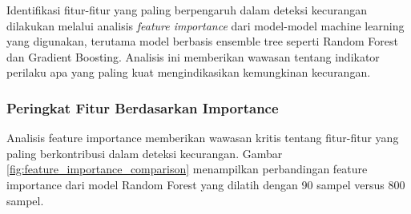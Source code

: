 Identifikasi fitur-fitur yang paling berpengaruh dalam deteksi kecurangan dilakukan melalui analisis \textit{feature importance} dari model-model machine learning yang digunakan, terutama model berbasis ensemble tree seperti Random Forest dan Gradient Boosting. Analisis ini memberikan wawasan tentang indikator perilaku apa yang paling kuat mengindikasikan kemungkinan kecurangan.

\subsubsection{Peringkat Fitur Berdasarkan Importance}

Analisis feature importance memberikan wawasan kritis tentang fitur-fitur yang paling berkontribusi dalam deteksi kecurangan. Gambar \ref{fig:feature_importance_comparison} menampilkan perbandingan feature importance dari model Random Forest yang dilatih dengan 90 sampel versus 800 sampel.


